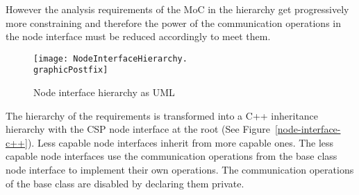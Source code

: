 However the analysis requirements of the MoC in the hierarchy
get progressively more constraining and therefore the power
of the communication operations in the node interface must
be reduced accordingly to meet them.

\begin{figure}
\centering
\texttt{[image: NodeInterfaceHierarchy.\\graphicPostfix]}\\
\caption{\label{node-interface-hierarchy}Node interface hierarchy as UML}
\end{figure}

The hierarchy of the requirements is transformed into a C++ inheritance
hierarchy with the CSP node interface at the root (See Figure~\ref{node-interface-c++}).
Less capable node interfaces inherit from more capable ones. The
less capable node interfaces use the communication operations from the base class node
interface to implement their own operations. The communication operations of the
base class are disabled by declaring them private.

